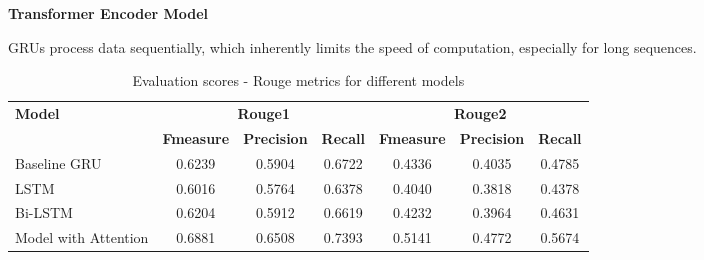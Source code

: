 \documentclass{article}
\begin{document}


\textbf{Transformer Encoder Model}

GRUs process data sequentially, which inherently limits the speed of computation, especially for long sequences. 

\begin{table}[ht]
    \centering
    \begin{tabular}{lcccccc}
    \hline
    \textbf{Model} & \multicolumn{3}{c}{\textbf{Rouge1}} & \multicolumn{3}{c}{\textbf{Rouge2}} \\
     & \textbf{Fmeasure} & \textbf{Precision} & \textbf{Recall} & \textbf{Fmeasure} & \textbf{Precision} & \textbf{Recall} \\
    \hline
    Baseline GRU & 0.6239 & 0.5904 & 0.6722 & 0.4336 & 0.4035 & 0.4785 \\
    LSTM & 0.6016 & 0.5764 & 0.6378 & 0.4040 & 0.3818 & 0.4378 \\
    Bi-LSTM & 0.6204 & 0.5912 & 0.6619 & 0.4232 & 0.3964 & 0.4631 \\
    Model with Attention & 0.6881 & 0.6508 & 0.7393 & 0.5141 & 0.4772 & 0.5674 \\
    \hline
    \end{tabular}
    \caption{Evaluation scores - Rouge metrics for different models}
    \label{table:rouge_scores}
\end{table}
\end{document}
